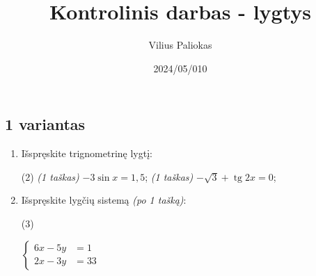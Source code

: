 \documentclass[a4paper]{article}
\title{Kontrolinis darbas - lygtys}
\author{Vilius Paliokas}
\date{2024/05/010}
\DeclareMathOperator{\tg}{tg}
\begin{document}
\thispagestyle{fancy}

\titlespacing*{\subsection}{0pt}{.75ex}{0.75ex}

\subsection*{1 variantas}

\begin{enumerate}
      \item Išspręskite trignometrinę lygtį:
            \begin{tasks}[item-format={\normalfont}, after-item-skip=4mm](2)
                  \task \textit{(1 taškas)} $-3\sin{x}=1,5$;
                  \task \textit{(1 taškas)} $-\sqrt{3}+\tg{2x}=0$;
            \end{tasks}

      \item Išspręskite lygčių sistemą \textit{(po 1 tašką)}:
            \begin{tasks}[item-format={\normalfont}, after-item-skip=4mm](3)
                  \task   \par\vspace{-1.3\baselineskip}%
                  $\left\{\begin{aligned}
                              6x - 5y & = 1  \\
                              2x - 3y & = 33
                        \end{aligned}\right.$


\end{tasks}
\end{enumerate}
\end{document}
